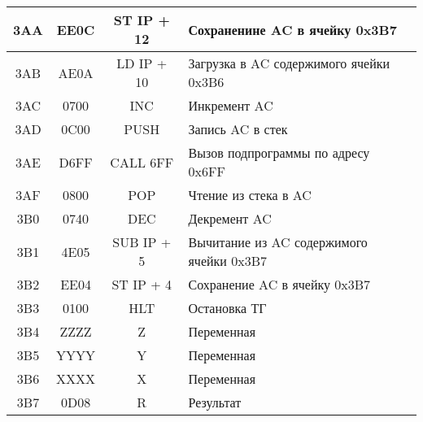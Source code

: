 \begin{center}
\begin{tabular}{|c|c|c|l|}
			3AA & EE0C & ST IP + 12 & Сохраненине AC в ячейку 0x3B7 \\
			\hline
			3AB & AE0A & LD IP + 10 & Загрузка в AC содержимого ячейки 0x3B6 \\

			3AC & 0700 & INC & Инкремент AC \\

			3AD & 0C00 & PUSH & Запись AC в стек \\

			3AE & D6FF & CALL 6FF & Вызов подпрограммы по адресу 0x6FF\\
			3AF & 0800 & POP & Чтение из стека в AC \\

			3B0 & 0740 & DEC & Декремент AC \\

			3B1 & 4E05 & SUB IP + 5 & Вычитание из AC содержимого ячейки 0x3B7 \\

			3B2 & EE04 & ST IP + 4 & Сохранение AC в ячейку 0x3B7 \\

			3B3 & 0100 & HLT & Остановка ТГ \\
			\hline
			3B4 & ZZZZ & Z & Переменная \\

			3B5 & YYYY & Y & Переменная \\

			3B6 & XXXX & X & Переменная \\

			3B7 & 0D08 & R & Результат \\
			\hline
	\end{tabular}
\end{center}

\newpage




